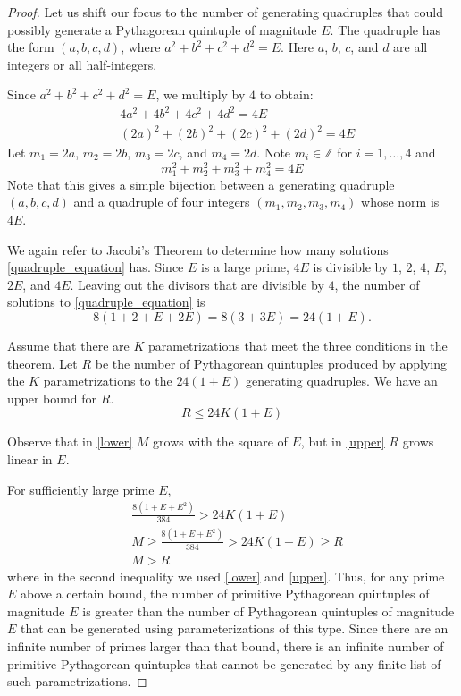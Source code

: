 \documentclass[12pt,table]{article}
\theoremstyle{definition}
\theoremstyle{remark}
\newcommand{\Zzz}{\mathbb Z}
\numberwithin{equation}{section}
\begin{document}
\begin{proof}
Let us shift our focus to the number of generating quadruples that could 
possibly generate a Pythagorean quintuple of magnitude $E$.
The quadruple has the form $(a,b,c,d)$, 
where $a^2 + b^2 + c^2 + d^2 = E$. 
Here $a$, $b$, $c$, and $d$ are all integers or all half-integers.

Since $a^2 + b^2 + c^2 + d^2 = E$, we multiply by $4$ to obtain:
\begin{align*}
     & 4a^2 + 4b^2 + 4c^2 + 4d^2 = 4E\\
     & (2a)^2 + (2b)^2 + (2c)^2 + (2d)^2 = 4E
\end{align*}
Let $m_1 = 2a$, $m_2 = 2b$, $m_3 = 2c$, 
and $m_4 = 2d$.
Note $m_i \in \Zzz$ for $i = 1, \ldots, 4$ and
\begin{equation}
\label{quadruple_equation}
m_1^2 + m_2^2 + m_3^2 + m_4^2 = 4E
\end{equation}
Note that this gives 
a simple bijection between a generating quadruple
 $(a,b,c,d)$ and a quadruple of four integers $(m_1,m_2,m_3,m_4)$ whose norm is $4E$.

We again refer to
Jacobi's Theorem to
determine how many solutions
\eqref{quadruple_equation} has.
Since $E$ is a large
prime,
$4E$ is divisible by $1$, $2$, $4$, $E$, $2E$, and $4E$. 
Leaving 
out the divisors that are divisible by $4$, 
the number of solutions to \eqref{quadruple_equation}
is 
\[
     8(1 + 2 + E + 2E) = 8(3 + 3E) = 24(1 + E).
\]


Assume that there are $K$ parametrizations
that meet the three conditions in the theorem. 
Let $R$ be the number of Pythagorean quintuples produced by applying
the $K$ parametrizations to the $24(1+E)$ generating quadruples. 
We have
an upper bound for $R$.
\begin{equation}
\label{upper}
R \leq 24K(1+E)
\end{equation}



Observe that in \eqref{lower} $M$ grows with the square of $E$, but in 
\eqref{upper} $R$ grows linear  in $E$.

For sufficiently large prime $E$, 
\begin{align*}
   & \frac{ 8(1+E+E^2) }{384} > 24K(1+E) \\
   & M \geq \frac{ 8(1+E+E^2) }{384} > 24K(1+E) \geq R \\
   & M > R
\end{align*}
where in the second inequality we used
\eqref{lower} and \eqref{upper}.
Thus, 
for any prime $E$ above a certain bound, 
the number of primitive  Pythagorean 
quintuples of magnitude $E$ is greater than the number of 
Pythagorean quintuples of magnitude $E$ that can be generated 
using parameterizations of this type.
Since there are an infinite number of primes larger 
than that bound, there is an 
infinite number of primitive  Pythagorean 
quintuples that cannot be generated by
 any finite list of such parametrizations.
\end{proof}
\end{document}
